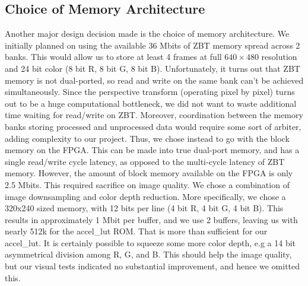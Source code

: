 \documentclass{article}
\begin{document}
\subsection{Choice of Memory Architecture}
Another major design decision made is the choice of memory architecture.
We initially planned on using the available 36 Mbits of ZBT memory spread across 2 banks.
This would allow us to store at least 4 frames at full $640 \times 480$  resolution and 24 bit color (8 bit R, 8 bit G, 8 bit B).
Unfortunately, it turns out that ZBT memory is not dual-ported, so read and write on the same bank can't be achieved simultaneously.
Since the perspective transform (operating pixel by pixel) turns out to be a huge computational bottleneck,
we did not want to waste additional time waiting for read/write on ZBT.
Moreover, coordination between the memory banks storing processed and unprocessed data would require some sort of arbiter, adding complexity to our project.
Thus, we chose instead to go with the block memory on the FPGA.
This can be made into true dual-port memory, and has a single read/write cycle latency, as opposed to the multi-cycle latency of ZBT memory.
However, the amount of block memory available on the FPGA is only 2.5 Mbits.
This required sacrifice on image quality.
We chose a combination of image downsampling and color depth reduction.
More specifically, we chose a 320x240 sized memory, with 12 bits per line (4 bit R, 4 bit G, 4 bit B).
This results in approximately 1 Mbit per buffer, and we use 2 buffers, leaving us with nearly 512k for the accel\_lut ROM.
That is more than sufficient for our accel\_lut.
It is certainly possible to squeeze some more color depth, e.g a 14 bit asymmetrical division among R, G, and B.
This should help the image quality, but our visual tests indicated no substantial improvement, and hence we omitted this.
\end{document}
